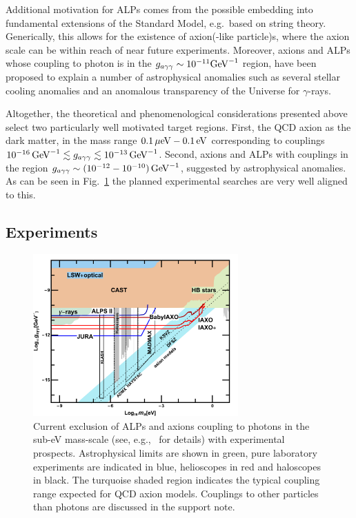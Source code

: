 \documentclass[../report.tex]{subfiles}
\begin{document}
Additional motivation for ALPs comes from the possible embedding into fundamental extensions of the Standard Model, e.g.\ based on string theory.
Generically, this allows for the existence of 
axion(-like particle)s, where the axion scale can be within reach of near future experiments. 
Moreover, axions and ALPs whose coupling to
photon is in the  $g_{a\gamma\gamma} \sim 10^{-11}{\rm GeV}^{-1}$ region, have been proposed to explain a number of astrophysical anomalies such as several stellar cooling anomalies and an anomalous transparency of the Universe for $\gamma$-rays.

Altogether, the theoretical and phenomenological considerations presented above select two particularly well motivated target regions. First, the QCD axion as the dark matter, in the mass range $0.1\,\mu{\rm eV}-0.1\,{\rm eV}$ corresponding to couplings $10^{-16}\,{\rm GeV}^{-1}\lesssim g_{a\gamma\gamma}\lesssim 10^{-13}\,{\rm GeV}^{-1}$. Second, axions and ALPs with couplings in the region $g_{a\gamma\gamma}\sim (10^{-12}-10^{-10})\,{\rm GeV}^{-1}$, suggested by astrophysical anomalies. As can be seen in Fig.~\ref{fig:alpsfig} the planned experimental searches are very well aligned to this.

\subsection{Experiments}

\begin{figure}[!t]
\centering
\includegraphics[width=0.7\textwidth]{Darkmatter/section4/esppalp2035.pdf}
\hspace*{1cm}
\caption{{Current exclusion of ALPs and axions coupling to photons in the sub-eV
mass-scale (see, e.g.,~\cite{Jaeckel:2010ni,Irastorza:2018dyq} for details) with experimental prospects. Astrophysical limits are shown in green, pure laboratory experiments are indicated in blue, helioscopes in red and haloscopes in black. The turquoise shaded region indicates the typical coupling range expected for QCD axion models. Couplings to other particles than photons are discussed in the support note.} }
\label{fig:alpsfig}	
\end{figure}
\end{document}
